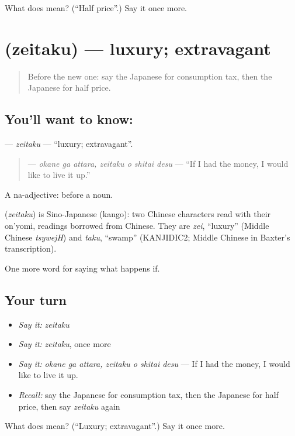 \begin{tcolorbox}[breakable,colback=teal!4,colframe=teal!35!black,title={Before you move on}]
What does  mean? (\textquotedblleft{}Half price\textquotedblright{}.) Say it once more.
\end{tcolorbox}
\section[\texorpdfstring{\ja{ぜいたく} (zeitaku)}{ぜいたく (zeitaku)}]{ (zeitaku) — luxury; extravagant}

\label{lesson:JA-C363-zeitaku}



\begin{quote}
Before the new one: say the Japanese for consumption tax, then the Japanese for half price.
\end{quote}

\subsection*{You'll want to know: }
\textbf{} — \emph{zeitaku} — \textquotedblleft{}luxury; extravagant\textquotedblright{}.

\begin{quote}
\textbf{  } — \emph{okane ga attara, zeitaku o shitai desu} — \textquotedblleft{}If I had the money, I would like to live it up.\textquotedblright{}
\end{quote}

A na-adjective:  before a noun.

\begin{cousinweb}
\textbf{} (\emph{zeitaku}) is Sino-Japanese (kango): two Chinese characters read with their on'yomi, readings borrowed from Chinese. They are \emph{zei}, \textquotedblleft{}luxury\textquotedblright{} (Middle Chinese \emph{tsywejH}) and \emph{taku}, \textquotedblleft{}swamp\textquotedblright{} (KANJIDIC2; Middle Chinese in Baxter's transcription).
\end{cousinweb}

\begin{grammarlens}[title={What you've built}]
One more word for saying what happens if.
\end{grammarlens}

\subsection*{Your turn}
\begin{itemize}
\raggedright
  \item \emph{Say it:} \emph{zeitaku}
  \item \emph{Say it:} \emph{zeitaku}, once more
  \item \emph{Say it:} \emph{okane ga attara, zeitaku o shitai desu} — If I had the money, I would like to live it up.
  \item \emph{Recall:} say the Japanese for consumption tax, then the Japanese for half price, then say \emph{zeitaku} again
\end{itemize}

\begin{tcolorbox}[breakable,colback=teal!4,colframe=teal!35!black,title={Before you move on}]
What does  mean? (\textquotedblleft{}Luxury; extravagant\textquotedblright{}.) Say it once more.
\end{tcolorbox}
